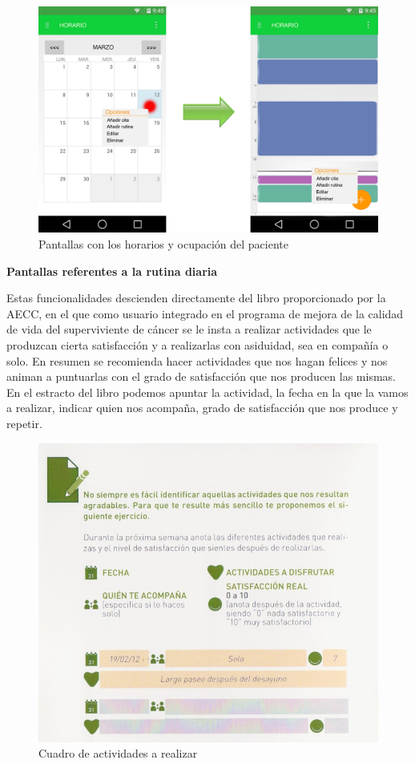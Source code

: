 \documentclass[../pfc.tex]{subfiles}
\begin{document}
		
		\begin{figure}[H]
			\centering
			\includegraphics[width=0.7\linewidth]{../images/horario_2}
			\caption[Horario de actividades]{Pantallas con los horarios y ocupación del paciente}
			\label{fig:horario_2}
		\end{figure}
		
		
		\textbf{Pantallas referentes a la rutina diaria}
		
		Estas funcionalidades descienden directamente del libro proporcionado por la AECC, en el que como usuario integrado en el programa de mejora de la calidad de vida del superviviente de cáncer se le insta a realizar actividades que le produzcan cierta satisfacción y a realizarlas con asiduidad, sea en compañía o solo. En resumen se recomienda hacer actividades que nos hagan felices y nos animan a puntuarlas con el grado de satisfacción que nos producen las mismas. En el estracto del libro podemos apuntar la actividad, la fecha en la que la vamos a realizar, indicar quien nos acompaña, grado de satisfacción que nos produce y repetir.
		
		
		
		\begin{figure}[H]
			\centering
			\includegraphics[width=0.7\linewidth]{../folleto/006_corto}
			\caption{Cuadro de actividades a realizar}
			\label{fig:006}
		\end{figure}
\end{document}
